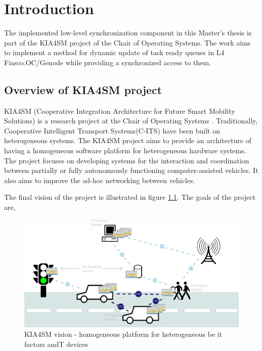 
\chapter{Introduction}\label{chapter:introduction}

The implemented low-level synchronization component in this Master's thesis is part of the KIA4SM project of the Chair of Operating Systems. The work aims to implement a method for dynamic update of task ready queues in L4 Fiasco.OC/Genode while providing a synchronized access to them.


\section{Overview of KIA4SM project}

KIA4SM (Cooperative Integration Architecture for Future Smart Mobility Solutions) is a research project at the Chair of Operating Systems \cite{kia4sm}. Traditionally, Cooperative Intelligent Transport Systems(C-ITS) have been built on heterogeneous systems. The KIA4SM project aims to provide an architecture of having a homogeneous software platform for heterogeneous hardware systems. The project focuses on developing systems for the interaction and coordination between partially or fully autonomously functioning computer-assisted vehicles. It also aims to improve the ad-hoc networking between vehicles.

The final vision of the project is illustrated in figure \ref{kia4sm}. The goals of the project are,

\begin{figure}[h]
  \centering
  \includegraphics[scale = 1]{figures/kia4sm_vision.png}
  \caption{KIA4SM vision - homogeneous platform for heterogeneous be it  factors andT devices \cite{kia4sm}} \label{kia4sm}
\end{figure}

